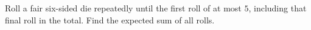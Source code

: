 Roll a fair six-sided die repeatedly until the first roll of at most $5$, including that final roll in the total. Find the expected sum of all rolls.
